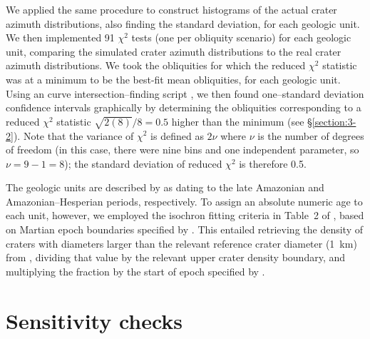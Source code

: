 \documentclass{ucetd}
\begin{document}
We applied the same procedure to construct histograms of the actual crater azimuth distributions, also finding the standard deviation, for each geologic unit. We then implemented 91 $\chi^2$ tests (one per obliquity scenario) for each geologic unit, comparing the simulated crater azimuth distributions to the real crater azimuth distributions. We took the obliquities for which the reduced $\chi^2$ statistic was at a minimum to be the best-fit mean obliquities, for each geologic unit. Using an curve intersection--finding script \citep{schwarz2017a}, we then found one--standard deviation confidence intervals graphically by determining the obliquities corresponding to a reduced $\chi^2$ statistic $\sqrt{2(8)}/8 = 0.5$ higher than the minimum (see §\ref{section:3-2}). Note that the variance of $\chi^2$ is defined as $2\nu$ where $\nu$ is the number of degrees of freedom (in this case, there were nine bins and one independent parameter, so $\nu=9-1=8$); the standard deviation of reduced $\chi^2$ is therefore 0.5.

The geologic units are described by \citet{tanaka2014a} as dating to the late Amazonian and Amazonian--Hesperian periods, respectively. To assign an absolute numeric age to each unit, however, we employed the isochron fitting criteria in Table~2 of \citet{michael2013a}, based on Martian epoch boundaries specified by \citet{hartmann2005a}. This entailed retrieving the density of craters with diameters larger than the relevant reference crater diameter (1~km) from \citet{tanaka2014a}, dividing that value by the relevant upper crater density boundary, and multiplying the fraction by the start of epoch specified by \citet{hartmann2005a}.

\section{Sensitivity checks}
\label{section:2-5}
\end{document}
